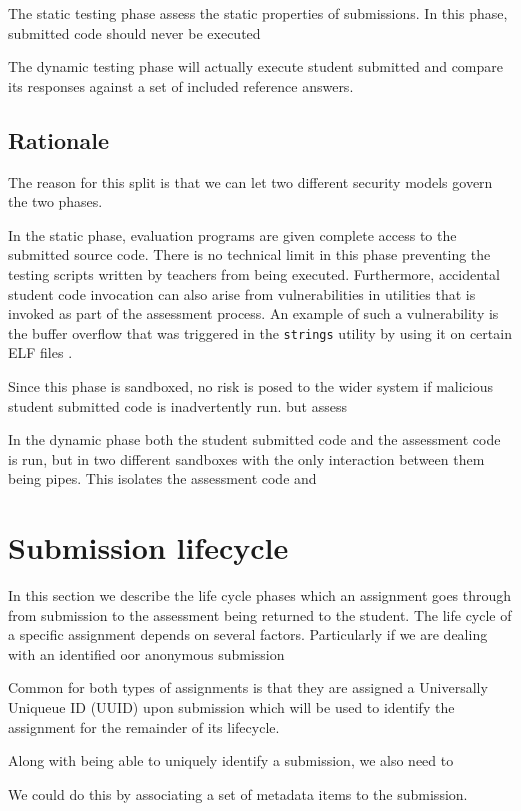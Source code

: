 The static testing phase assess the static properties of
submissions. In this phase, submitted code should never be executed

The dynamic testing phase will actually execute student submitted and
compare its responses against a set of included reference answers.

\subsection{Rationale}
The reason for this split is that we can let two different security
models govern the two phases.

In the static phase, evaluation programs are given complete access to
the submitted source code. There is no technical limit in this phase
preventing the testing scripts written by teachers from being
executed. Furthermore, accidental student code invocation can also
arise from vulnerabilities in utilities that is invoked as part of the
assessment process. An example of such a vulnerability is the buffer
overflow that was triggered in the \texttt{strings} utility by using
it on certain ELF files \cite{stringsvuln}. 

Since this phase is sandboxed, no risk is posed to the wider system if
malicious student submitted code is inadvertently run. but assess

In the dynamic phase both the student submitted code and the
assessment code is run, but in two different sandboxes with the only
interaction between them being pipes. This isolates the assessment
code and 


\section{Submission lifecycle}
In this section we describe the life cycle phases which an assignment
goes through from submission to the assessment being returned to the
student. The life cycle of a specific assignment depends on several
factors. Particularly if we are dealing with an identified oor
anonymous submission

Common for both types of assignments is that they are assigned a
Universally Uniqueue ID (UUID) upon submission which will be used to
identify the assignment for the remainder of its lifecycle.

Along with being able to uniquely identify a submission, we also need
to 

We could do this by associating a set of metadata items to the
submission.

